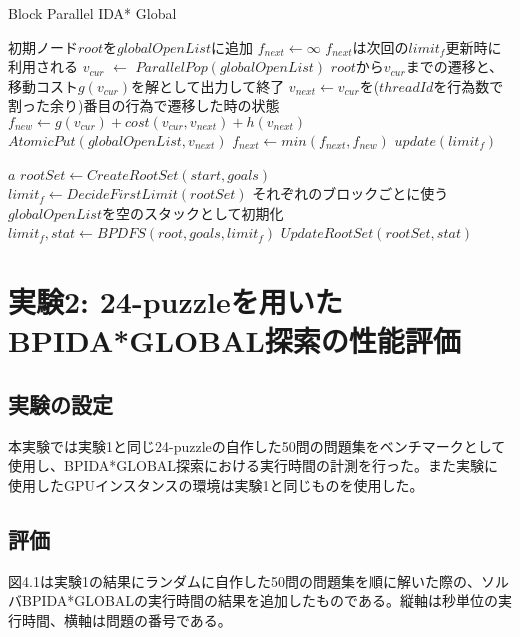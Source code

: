 \documentclass[a4paper,11pt,oneside,openany]{jsbook}
\begin{document}
\newpage
\begin{algorithm}
\caption{Block Parallel IDA* Global}
\label{alg:pbnf}
\begin{algorithmic}[1]
    \State 初期ノード$root$を$globalOpenList$に追加
    \State $f_{next} \leftarrow \infty$
    \State $f_{next}$は次回の$limit_f$更新時に利用される 
        \State $v_{cur}$ $\leftarrow$ ${ParallelPop}(globalOpenList)$
            \State $root$から$v_{cur}$までの遷移と、移動コスト$g(v_{cur})$を解として出力して終了
        \EndIf
        \State $v_{next} \gets $$v_{cur}$を($threadId$を行為数で割った余り)番目の行為で遷移した時の状態
        \State $f_{new} \leftarrow g(v_{cur}) + cost(v_{cur}, v_{next}) + h(v_{next})$
            \State ${AtomicPut}(globalOpenList, v_{next})$ 
        \Else
            \State $f_{next} \leftarrow min(f_{next}, f_{new})$
        \EndIf
    \EndWhile
    \State $update(limit_f)$

    \State \Return $a$
\EndFunction
{}
    \State $rootSet \gets {CreateRootSet}(start, goals)$
    \State $limit_f \leftarrow {DecideFirstLimit}(rootSet)$
    \State それぞれのブロックごとに使う$globalOpenList$を空のスタックとして初期化
            \State $limit_f, stat \gets {BPDFS}(root, goals, limit_f)$
        \EndParallelForByBlocks
        \State $UpdateRootSet(rootSet, stat)$
    \EndWhile
\EndFunction

\end{algorithmic}
\end{algorithm}
\newpage

\section{実験2: 24-puzzleを用いたBPIDA*GLOBAL探索の性能評価}
\subsection{実験の設定}
本実験では実験1と同じ24-puzzleの自作した50問の問題集をベンチマークとして使用し、BPIDA*GLOBAL探索における実行時間の計測を行った。また実験に使用したGPUインスタンスの環境は実験1と同じものを使用した。


\subsection{評価}
図4.1は実験1の結果にランダムに自作した50問の問題集を順に解いた際の、ソルバBPIDA*GLOBALの実行時間の結果を追加したものである。縦軸は秒単位の実行時間、横軸は問題の番号である。
\end{document}
